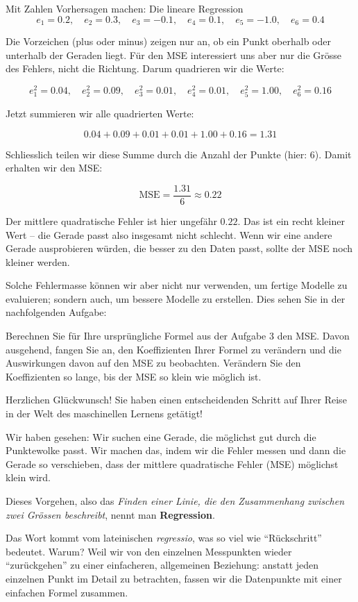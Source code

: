 \begin{lpu}{Mit Zahlen Vorhersagen machen: Die lineare Regression}
\[
e_1 = 0.2,\quad e_2 = 0.3,\quad e_3 = -0.1,\quad e_4 = 0.1,\quad e_5 = -1.0,\quad e_6 = 0.4
\]

Die Vorzeichen (plus oder minus) zeigen nur an, ob ein Punkt oberhalb oder unterhalb der Geraden liegt. Für den MSE interessiert uns aber nur die Grösse des Fehlers, nicht die Richtung. Darum quadrieren wir die Werte:

\[
e_1^2 = 0.04,\quad e_2^2 = 0.09,\quad e_3^2 = 0.01,\quad e_4^2 = 0.01,\quad e_5^2 = 1.00,\quad e_6^2 = 0.16
\]

Jetzt summieren wir alle quadrierten Werte:

\[
0.04 + 0.09 + 0.01 + 0.01 + 1.00 + 0.16 = 1.31
\]

Schliesslich teilen wir diese Summe durch die Anzahl der Punkte (hier: 6). Damit erhalten wir den MSE:

\[
\text{MSE} = \frac{1.31}{6} \approx 0.22
\]

Der mittlere quadratische Fehler ist hier ungefähr $0.22$. Das ist ein recht kleiner Wert – die Gerade passt also insgesamt nicht schlecht. Wenn wir eine andere Gerade ausprobieren würden, die besser zu den Daten passt, sollte der MSE noch kleiner werden.

Solche Fehlermasse können wir aber nicht nur verwenden, um fertige Modelle zu evaluieren; sondern auch, um bessere Modelle zu erstellen. Dies sehen Sie in der nachfolgenden Aufgabe:

\begin{aufgabe}{4}
    Berechnen Sie für Ihre ursprüngliche Formel aus der Aufgabe 3 den MSE. Davon ausgehend, fangen Sie an, den Koeffizienten Ihrer Formel zu verändern und die Auswirkungen davon auf den MSE zu beobachten. Verändern Sie den Koeffizienten so lange, bis der MSE so klein wie möglich ist.
\end{aufgabe}

Herzlichen Glückwunsch! Sie haben einen entscheidenden Schritt auf Ihrer Reise in der Welt des maschinellen Lernens getätigt!

Wir haben gesehen: Wir suchen eine Gerade, die möglichst gut durch die Punktewolke passt. Wir machen das, indem wir die Fehler messen und dann die Gerade so verschieben, dass der mittlere quadratische Fehler (MSE) möglichst klein wird.

Dieses Vorgehen, also das \textit{Finden einer Linie, die den Zusammenhang zwischen zwei Grössen beschreibt}, nennt man \textbf{Regression}.

Das Wort kommt vom lateinischen \textit{regressio}, was so viel wie ``Rückschritt'' bedeutet. Warum? Weil wir von den einzelnen Messpunkten wieder ``zurückgehen'' zu einer einfacheren, allgemeinen Beziehung: anstatt jeden einzelnen Punkt im Detail zu betrachten, fassen wir die Datenpunkte mit einer einfachen Formel zusammen.


\end{lpu}

